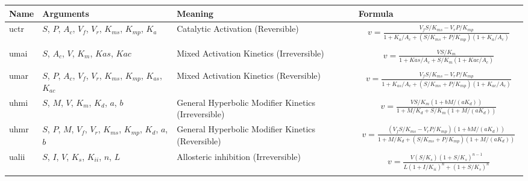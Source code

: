 \documentclass[10pt]{cekarticle}
\newenvironment{blockChanged}{\color{BrickRed}}{}
\begin{document}
\addtocounter{table}{-1}
\begin{table}[ht]
\setlength{\abovedisplayskip}{-2pt}
\setlength{\belowdisplayskip}{1pt}
\begin{tabular}{|p{0.45in}|>{\raggedright}m{0.77in}|>{\raggedright}m{1.2in}|m{3.35in}|}
\hline
\textbf{Name} & \textbf{Arguments} & \textbf{Meaning} & \textbf{Formula} \\
\hline

uctr & $S$, $P$, $A_c$, $V_f$, $V_r$, $K_{ms}$, $K_{mp}$, $K_a$ &
Catalytic Activation (Reversible) &
\begin{gather*}
v = \frac{V_f S/K_{ms} - V_r P/K_{mp}}{1 +
K_a/A_c + \left( S/K_{ms} + P/K_{mp}\right) \left( 1 + K_a/A_c\right)}
\end{gather*}
\\ \hline

umai & $S$, $A_c$, $V$, $K_m$, $Kas$, $Kac$ & Mixed Activation
Kinetics (Irreversible) &
\begin{gather*}
v = \frac{V S/K_m}{1 + Kas/A_c + S/K_m \left( 1 + Kac/A_c\right)}
\end{gather*}
\\ \hline

umar & $S$, $P$, $A_c$, $V_f$, $V_r$, $K_{ms}$, $K_{mp}$, $K_{as}$, $K_{ac}$ &
Mixed Activation Kinetics (Reversible) &
\begin{gather*}
v = \frac{V_f S/K_{ms} - V_r P/K_{mp}}{1 + K_{as}/A_c + \left( S/K_{ms} +
    P/K_{mp}\right) \left( 1 + K_{ac}/A_c\right)}
\end{gather*}
\\ \hline

uhmi & $S$, $M$, $V$, $K_m$, $K_d$, $a$, $b$ & General Hyperbolic
Modifier Kinetics (Irreversible) &
\begin{gather*}
v = \frac{V S/K_m \left( 1 + b
M / (a K_d)\right) }{1 + M/K_d + S/K_m \left( 1 + M/(a K_d)\right)}
\end{gather*}
\\ \hline

uhmr & $S$, $P$, $M$, $V_f$, $V_r$, $K_{ms}$, $K_{mp}$, $K_d$, $a$, $b$ &
General Hyperbolic Modifier Kinetics (Reversible) &
\begin{gather*}
v = \frac{\left( V_f S/K_{ms} - V_r P/K_{mp}\right) \left( 1 + b M / (a
K_d)\right) }{1 + M/K_d + \left( S/K_{ms} + P/K_{mp} \right) \left( 1 +
M/(a K_d)\right)}
\end{gather*}
\\ \hline

ualii & $S$, $I$, $V$, $K_s$, $K_{ii}$, $n$, $L$ & Allosteric inhibition
(Irreversible) &
\begin{blockChanged}
\begin{gather*}
v = \frac{V \left(S/K_s\right) \left( 1 + S/K_s\right)^{n-1}}{L \left(
1 + I/K_{ii}\right)^n + \left( 1 + S/K_s \right)^n}
\end{gather*}
\end{blockChanged}
\\ \hline


\end{tabular}
\end{table}
\end{document}
